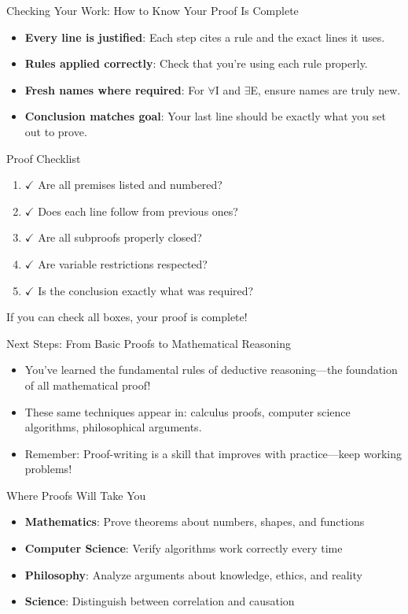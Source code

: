 \documentclass{beamer}
\begin{document}
	\begin{frame}{Checking Your Work: How to Know Your Proof Is Complete}
		\begin{itemize}
			\item \textbf{Every line is justified}: Each step cites a rule and the exact lines it uses.
			\item \textbf{Rules applied correctly}: Check that you're using each rule properly.
			\item \textbf{Fresh names where required}: For $\forall$I and $\exists$E, ensure names are truly new.
			\item \textbf{Conclusion matches goal}: Your last line should be exactly what you set out to prove.
		\end{itemize}
		
		\begin{block}{Proof Checklist}
			\begin{enumerate}
				\item $\checkmark$ Are all premises listed and numbered?
				\item $\checkmark$ Does each line follow from previous ones?
				\item $\checkmark$ Are all subproofs properly closed?
				\item $\checkmark$ Are variable restrictions respected?
				\item $\checkmark$ Is the conclusion exactly what was required?
			\end{enumerate}
			If you can check all boxes, your proof is complete!
		\end{block}
	\end{frame}
	
	\begin{frame}{Next Steps: From Basic Proofs to Mathematical Reasoning}
		\begin{itemize}
			\item You've learned the fundamental rules of deductive reasoning—the foundation of all mathematical proof!
			\item These same techniques appear in: calculus proofs, computer science algorithms, philosophical arguments.
			\item Remember: Proof-writing is a skill that improves with practice—keep working problems!
		\end{itemize}
		
		\begin{block}{Where Proofs Will Take You}
			\begin{itemize}
				\item \textbf{Mathematics}: Prove theorems about numbers, shapes, and functions
				\item \textbf{Computer Science}: Verify algorithms work correctly every time
				\item \textbf{Philosophy}: Analyze arguments about knowledge, ethics, and reality
				\item \textbf{Science}: Distinguish between correlation and causation
			\end{itemize}
		\end{block}
		
	\end{frame}
\end{document}
